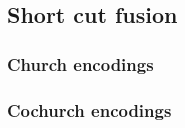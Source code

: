 \subsection{Short cut fusion}
\subsubsection{Church encodings}




\subsubsection{Cochurch encodings}


